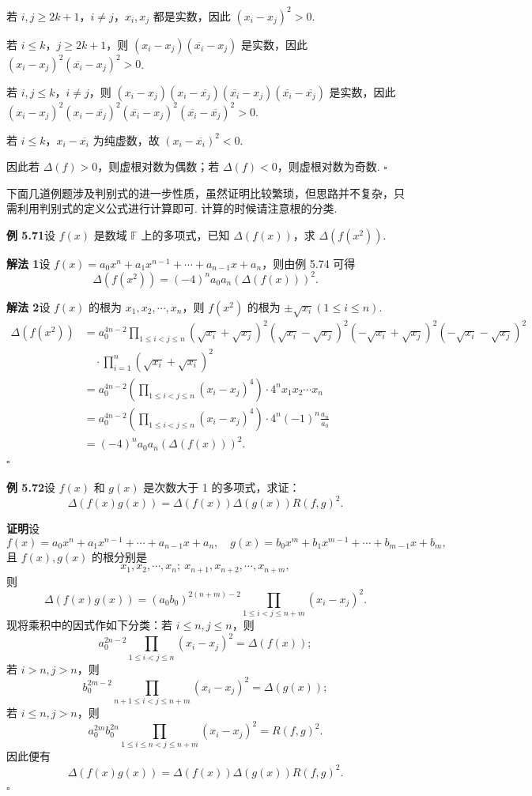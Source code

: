 \documentclass[UTF8, 12pt, fontset=fandol, oneside]{ctexart}
\begin{document}
若 $i,j\ge2k+1$，$i\ne j$，$x_i,x_j$ 都是实数，因此 $(x_i-x_j)^2>0$.

若 $i\le k$，$j\ge2k+1$，则 $(x_i-x_j)(\overline{x_i}-x_j)$ 是实数，因此 $(x_i-x_j)^2(\overline{x_i}-x_j)^2>0$.

若 $i,j\le k$，$i\ne j$，则 $(x_i-x_j)(x_i-\overline{x_j})(\overline{x_i}-x_j)(\overline{x_i}-\overline{x_j})$ 是实数，因此 $(x_i-x_j)^2(x_i-\overline{x_j})^2(\overline{x_i}-x_j)^2(\overline{x_i}-\overline{x_j})^2>0$.

若 $i\le k$，$x_i-\overline{x_i}$ 为纯虚数，故 $(x_i-\overline{x_i})^2<0$.

因此若 $\Delta(f)>0$，则虚根对数为偶数；若 $\Delta(f)<0$，则虚根对数为奇数. \hfill $\square$

下面几道例题涉及判别式的进一步性质，虽然证明比较繁琐，但思路并不复杂，只需利用判别式的定义公式进行计算即可. 计算的时候请注意根的分类.

\noindent\textbf{例 5.71}\quad 设 $f(x)$ 是数域 $\mathbb{F}$ 上的多项式，已知 $\Delta(f(x))$，求 $\Delta(f(x^2))$.

\noindent\textbf{解法 1}\quad 设 $f(x)=a_0x^n+a_1x^{n-1}+\cdots+a_{n-1}x+a_n$，则由例 5.74 可得
\[
\Delta(f(x^2))=(-4)^n a_0a_n(\Delta(f(x)))^2.
\]

\noindent\textbf{解法 2}\quad 设 $f(x)$ 的根为 $x_1,x_2,\cdots,x_n$，则 $f(x^2)$ 的根为 $\pm\sqrt{x_i}(1\le i\le n)$.
\[
\begin{aligned}
\Delta(f(x^2))
&=a_0^{4n-2}\prod_{1\le i<j\le n}(\sqrt{x_i}+\sqrt{x_j})^2(\sqrt{x_i}-\sqrt{x_j})^2(-\sqrt{x_i}+\sqrt{x_j})^2(-\sqrt{x_i}-\sqrt{x_j})^2\\
&\quad\cdot \prod_{i=1}^n(\sqrt{x_i}+\sqrt{x_i})^2\\
&=a_0^{4n-2}\left(\prod_{1\le i<j\le n}(x_i-x_j)^4\right)\cdot 4^nx_1x_2\cdots x_n\\
&=a_0^{4n-2}\left(\prod_{1\le i<j\le n}(x_i-x_j)^4\right)\cdot 4^n(-1)^n\frac{a_n}{a_0}\\
&=(-4)^na_0a_n(\Delta(f(x)))^2.
\end{aligned}
\]
\hfill $\square$

\noindent\textbf{例 5.72}\quad 设 $f(x)$ 和 $g(x)$ 是次数大于 1 的多项式，求证：
\[
\Delta(f(x)g(x))=\Delta(f(x))\Delta(g(x))R(f,g)^2.
\]

\noindent\textbf{证明}\quad 设
\[
f(x)=a_0x^n+a_1x^{n-1}+\cdots+a_{n-1}x+a_n,\quad
g(x)=b_0x^m+b_1x^{m-1}+\cdots+b_{m-1}x+b_m,
\]
且 $f(x),g(x)$ 的根分别是
\[
x_1,x_2,\cdots,x_n;\ x_{n+1},x_{n+2},\cdots,x_{n+m},
\]
则
\[
\Delta(f(x)g(x))=(a_0b_0)^{2(n+m)-2}\prod_{1\le i<j\le n+m}(x_i-x_j)^2.
\]
现将乘积中的因式作如下分类：若 $i\le n,j\le n$，则
\[
a_0^{2n-2}\prod_{1\le i<j\le n}(x_i-x_j)^2=\Delta(f(x));
\]
若 $i>n,j>n$，则
\[
b_0^{2m-2}\prod_{n+1\le i<j\le n+m}(x_i-x_j)^2=\Delta(g(x));
\]
若 $i\le n,j>n$，则
\[
a_0^{2m}b_0^{2n}\prod_{1\le i\le n<j\le n+m}(x_i-x_j)^2=R(f,g)^2.
\]
因此便有
\[
\Delta(f(x)g(x))=\Delta(f(x))\Delta(g(x))R(f,g)^2.
\]
\hfill $\square$
\end{document}
